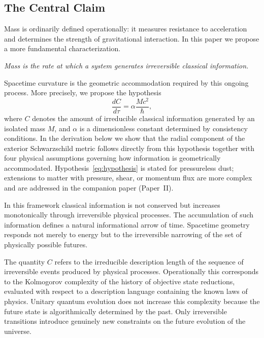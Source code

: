 \documentclass[12pt]{article}
\begin{document}
\subsection{The Central Claim}

Mass is ordinarily defined operationally: it measures resistance to
acceleration and determines the strength of gravitational interaction.
In this paper we propose a more fundamental characterization.

\emph{Mass is the rate at which a system generates irreversible classical
information.}

Spacetime curvature is the geometric accommodation required by this
ongoing process. More precisely, we propose the hypothesis
\begin{equation}
  \frac{dC}{d\tau} = \alpha \frac{Mc^2}{\hbar},
  \label{eq:hypothesis}
\end{equation}
where $C$ denotes the amount of irreducible classical information
generated by an isolated mass $M$, and $\alpha$ is a dimensionless
constant determined by consistency conditions.
In the derivation below we show that the radial component of the exterior
Schwarzschild metric follows directly from this hypothesis together with
four physical assumptions governing how information is geometrically
accommodated.
Hypothesis~\eqref{eq:hypothesis} is stated for pressureless dust;
extensions to matter with pressure, shear, or momentum flux are more
complex and are addressed in the companion paper (Paper~II).

In this framework classical information is not conserved but increases
monotonically through irreversible physical processes.
The accumulation of such information defines a natural informational
arrow of time.
Spacetime geometry responds not merely to energy but to the irreversible
narrowing of the set of physically possible futures.

The quantity $C$ refers to the irreducible description length of the
sequence of irreversible events produced by physical processes.
Operationally this corresponds to the Kolmogorov complexity
\cite{Kolmogorov1965} of the history of objective state reductions,
evaluated with respect to a description language containing the known
laws of physics.
Unitary quantum evolution does not increase this complexity because the
future state is algorithmically determined by the past.
Only irreversible transitions introduce genuinely new constraints on the
future evolution of the universe.
\end{document}
